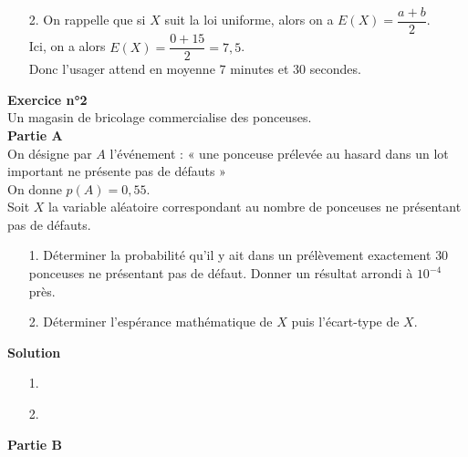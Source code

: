 \begin{itemize}
\begin{itemize}
\vspace*{.3cm}

\end{itemize}
\item[2.] On rappelle que si $X$ suit la loi uniforme, alors on a $E\left(X\right) = \dfrac{a + b}{2}$. \\

Ici, on a alors $E\left(X\right) = \dfrac{0 + 15}{2} = 7,5$. \\

Donc l'usager attend en moyenne $7$ minutes et $30$ secondes.
\end{itemize}

\newpage

\textbf{Exercice n°2} \\

Un magasin de bricolage commercialise des ponceuses. \\

\textbf{Partie A} \\

On désigne par $A$ l'événement : « une ponceuse prélevée au hasard dans un lot important ne présente pas de défauts » \\

On donne $p\left(A\right) = 0,55$. \\

Soit $X$ la variable aléatoire correspondant au nombre de ponceuses ne présentant pas de défauts. \\

\begin{itemize}
\item[1.] Déterminer la probabilité qu'il y ait dans un prélèvement exactement $30$ ponceuses ne présentant pas de défaut. Donner un résultat arrondi à $10^{-4}$ près. \\
\item[2.] Déterminer l'espérance mathématique de $X$ puis l'écart-type de $X$. \\
\end{itemize}

\textbf{Solution} \\

\begin{itemize}
\item[1.]
\item[2.]
\end{itemize}

\newpage

\textbf{Partie B} \\

